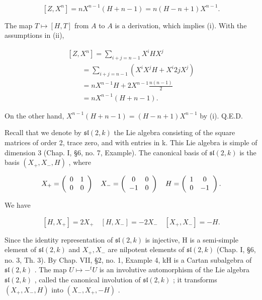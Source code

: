 \[
[ Z, X ^ {n} ] = n X ^ {n - 1} (H + n - 1) = n (H - n + 1) X ^ {n - 1}.
\]

The map \(T \mapsto [H, T]\) from \(A\) to \(A\) is a derivation, which implies (i). With the assumptions in (ii),

\[
\begin{array}{l} [ Z, X ^ {n} ] = \sum_ {i + j = n - 1} X ^ {i} H X ^ {j} \\ \qquad = \sum_ {i + j = n - 1} (X ^ {i} X ^ {j} H + X ^ {i} 2 j X ^ {j}) \\ \qquad = n X ^ {n - 1} H + 2 X ^ {n - 1} \frac {n (n - 1)}{2} \\ \qquad = n X ^ {n - 1} (H + n - 1). \end{array}
\]

On the other hand, \(X^{n-1}(H+n-1)=(H-n+1)X^{n-1}\) by (i). Q.E.D.

Recall that we denote by \(\mathfrak{sl}(2,k)\) the Lie algebra consisting of the square matrices of order 2, trace zero, and with entries in k. This Lie algebra is simple of dimension 3 (Chap. I, §6, no. 7, Example). The canonical basis of \(\mathfrak{sl}(2,k)\) is the basis \((X_{+},X_{-},H)\) , where

\[
X _ {+} = \left( \begin{array}{c c} 0 & 1 \\ 0 & 0 \end{array} \right) \quad X _ {-} = \left( \begin{array}{c c} 0 & 0 \\ - 1 & 0 \end{array} \right) \quad H = \left( \begin{array}{c c} 1 & 0 \\ 0 & - 1 \end{array} \right).
\]

We have

\[
[ H, X _ {+} ] = 2 X _ {+} \quad [ H, X _ {-} ] = - 2 X _ {-} \quad [ X _ {+}, X _ {-} ] = - H.\tag{1}
\]

Since the identity representation of \(\mathfrak{sl}(2,k)\) is injective, H is a semi-simple element of \(\mathfrak{sl}(2,k)\) and \(X_{+}, X_{-}\) are nilpotent elements of \(\mathfrak{sl}(2,k)\) (Chap. I, §6, no. 3, Th. 3). By Chap. VII, §2, no. 1, Example 4, kH is a Cartan subalgebra of \(\mathfrak{sl}(2,k)\) . The map \(U \mapsto -^{t}U\) is an involutive automorphism of the Lie algebra \(\mathfrak{sl}(2,k)\) , called the canonical involution of \(\mathfrak{sl}(2,k)\) ; it transforms \((X_{+}, X_{-}, H)\) into \((X_{-}, X_{+}, -H)\) .

